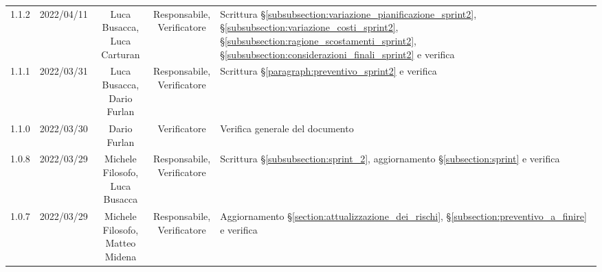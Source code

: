 \begin{center}
\begin{longtable}[c]{c | c | c | c | p{5cm}}
		1.1.2                                                      & 2022/04/11 & \Shortunderstack{Luca Busacca,                                                                                                                                                                      \\Luca Carturan} & \Shortunderstack{Responsabile,\\Verificatore} & Scrittura §\ref{subsubsection:variazione_pianificazione_sprint2}, §\ref{subsubsection:variazione_costi_sprint2}, §\ref{subsubsection:ragione_scostamenti_sprint2}, §\ref{subsubsection:considerazioni_finali_sprint2} e verifica\\
		1.1.1                                                      & 2022/03/31 & \Shortunderstack{Luca Busacca,                                                                                                                                                                      \\Dario Furlan} & \Shortunderstack{Responsabile,\\Verificatore} & Scrittura §\ref{paragraph:preventivo_sprint2} e verifica\\
		1.1.0                                                      & 2022/03/30 & Dario Furlan                           & Verificatore   & Verifica generale del documento                                                                                                           \\
		1.0.8                                                      & 2022/03/29 & \Shortunderstack{Michele Filosofo,                                                                                                                                                                  \\Luca Busacca} & \Shortunderstack{Responsabile,\\Verificatore} & Scrittura §\ref{subsubsection:sprint_2}, aggiornamento §\ref{subsection:sprint} e verifica\\
		1.0.7                                                      & 2022/03/29 & \Shortunderstack{Michele Filosofo,                                                                                                                                                                  \\Matteo Midena} & \Shortunderstack{Responsabile,\\Verificatore} & Aggiornamento §\ref{section:attualizzazione_dei_rischi}, §\ref{subsection:preventivo_a_finire} e verifica\\

\end{longtable}
\end{center}
